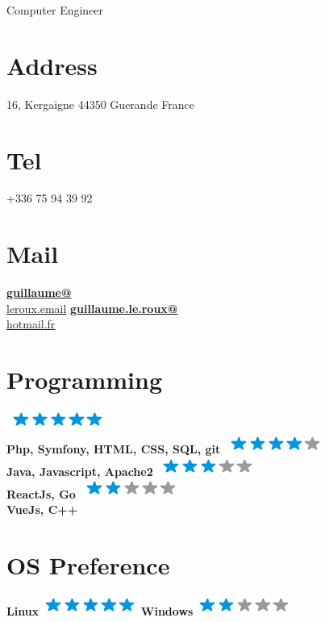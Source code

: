 \documentclass[]{friggeri-cv}
\begin{document}
      {Computer Engineer}


\begin{aside}
	\section{Address}
	16, Kergaigne
	44350 Guerande
	France
	~
	\section{Tel}
	+336 75 94 39 92
	~
	\section{Mail}
	\href{mailto:guillaume@leroux.email}{\textbf{guillaume@}\\leroux.email}
	\href{mailto:guillaume.le.roux@hotmail.fr}{\textbf{guillaume.le.roux@}\\hotmail.fr}
	\section{Programming}
	\includegraphics[scale=0.40]{img/5stars.png}\\\textbf{Php, Symfony, HTML, CSS, SQL, git}
	\includegraphics[scale=0.40]{img/4stars.png}\\\textbf{Java, Javascript, Apache2}
	\includegraphics[scale=0.40]{img/3stars.png}\\\textbf{ReactJs, Go}
	\includegraphics[scale=0.40]{img/2stars.png}\\\textbf{VueJs, C++}
	~
	\section{OS Preference}
	\textbf{Linux}\includegraphics[scale=0.40]{img/5stars.png}
	\textbf{Windows}\includegraphics[scale=0.40]{img/2stars.png}
	~

\end{aside}
\end{document}

